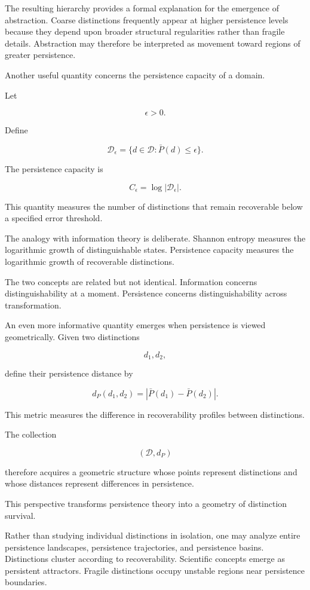 \documentclass[12pt,oneside]{article}
\theoremstyle{definition}
\begin{document}
The resulting hierarchy provides a formal explanation for the emergence of abstraction. Coarse distinctions frequently appear at higher persistence levels because they depend upon broader structural regularities rather than fragile details. Abstraction may therefore be interpreted as movement toward regions of greater persistence.

Another useful quantity concerns the persistence capacity of a domain.

Let

\[
\epsilon>0.
\]

Define

\[
\mathcal D_\epsilon
=
\{
d\in\mathcal D
:
\bar P(d)\le \epsilon
\}.
\]

The persistence capacity is

\[
C_\epsilon
=
\log |\mathcal D_\epsilon|.
\]

This quantity measures the number of distinctions that remain recoverable below a specified error threshold.

The analogy with information theory is deliberate. Shannon entropy measures the logarithmic growth of distinguishable states. Persistence capacity measures the logarithmic growth of recoverable distinctions.

The two concepts are related but not identical. Information concerns distinguishability at a moment. Persistence concerns distinguishability across transformation.

An even more informative quantity emerges when persistence is viewed geometrically. Given two distinctions

\[
d_1,d_2,
\]

define their persistence distance by

\[
d_P(d_1,d_2)
=
\left|
\bar P(d_1)-\bar P(d_2)
\right|.
\]

This metric measures the difference in recoverability profiles between distinctions.

The collection

\[
(\mathcal D,d_P)
\]

therefore acquires a geometric structure whose points represent distinctions and whose distances represent differences in persistence.

This perspective transforms persistence theory into a geometry of distinction survival.

Rather than studying individual distinctions in isolation, one may analyze entire persistence landscapes, persistence trajectories, and persistence basins. Distinctions cluster according to recoverability. Scientific concepts emerge as persistent attractors. Fragile distinctions occupy unstable regions near persistence boundaries.
\end{document}
